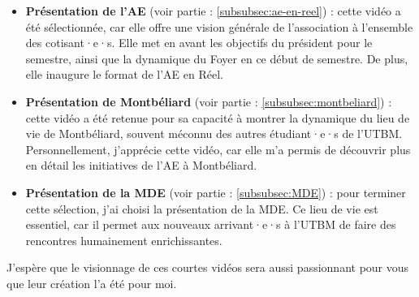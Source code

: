 \begin{itemize}
    \item \textbf{Présentation de l'\gls{AE}} (voir partie : \ref{subsubsec:ae-en-reel}) : cette vidéo a été sélectionnée, car elle offre une vision générale de l'association à l'ensemble des cotisant·e·s.
    Elle met en avant les objectifs du président pour le semestre, ainsi que la dynamique du Foyer en ce début de semestre.
    De plus, elle inaugure le format de l'\gls{AE} en Réel.
    \item \textbf{Présentation de Montbéliard} (voir partie : \ref{subsubsec:montbeliard}) : cette vidéo a été retenue pour sa capacité à montrer la dynamique du lieu de vie de Montbéliard, souvent méconnu des autres étudiant·e·s de l'\gls{UTBM}.
    Personnellement, j'apprécie cette vidéo, car elle m'a permis de découvrir plus en détail les initiatives de l'\gls{AE} à Montbéliard.
    \item \textbf{Présentation de la MDE} (voir partie : \ref{subsubsec:MDE}) : pour terminer cette sélection, j'ai choisi la présentation de la MDE. Ce lieu de vie est essentiel, car il permet aux nouveaux arrivant·e·s à l'\gls{UTBM} de faire des rencontres humainement enrichissantes.
\end{itemize}

J'espère que le visionnage de ces courtes vidéos sera aussi passionnant pour vous que leur création l'a été pour moi.